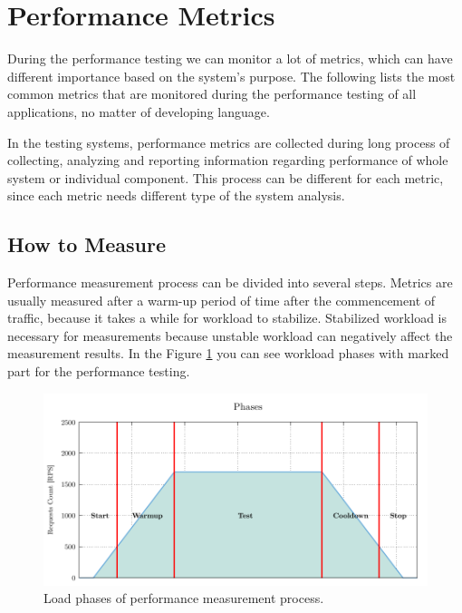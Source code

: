 \section{Performance Metrics}
\label{Performance Metrics}

During the performance testing we can monitor a lot of metrics, which can have different importance based on the system's purpose. The following lists the most common metrics that are monitored during the performance testing of all applications, no matter of developing language.

In the testing systems, performance metrics are collected during long process of collecting, analyzing and reporting information regarding performance of whole system or individual component. This process can be different for each metric, since each metric needs different type of the system analysis.

\subsection*{How to Measure}
Performance measurement process can be divided into several steps. Metrics are usually measured after a warm-up period of time after the commencement of traffic, because it takes a while for workload to stabilize. Stabilized workload is necessary for measurements because unstable workload can negatively affect the measurement results. In the Figure \ref{fig:measurements} you can see workload phases with marked part for the performance testing.

\begin{figure}[H]
  \centering
  \includegraphics[width=15cm]{obrazky-figures/measure_demo.pdf}
  \caption{Load phases of performance measurement process.}
  \label{fig:measurements}
\end{figure}


